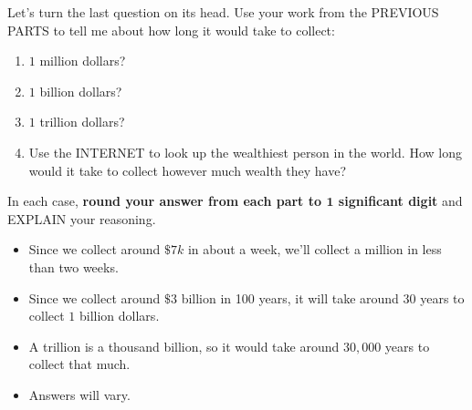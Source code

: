 \documentclass[nooutcomes,noauthor,hints,handout]{ximera}
\begin{document}
\begin{question}
  Let's turn the last question on its head. Use your work from the
  PREVIOUS PARTS to tell me about how long it would take to collect:
  \begin{enumerate}
  \item $1$ million dollars?
  \item $1$ billion dollars?
  \item $1$ trillion dollars?
  \item Use the INTERNET to look up the wealthiest person in the
    world. How long would it take to collect however much wealth they have?
  \end{enumerate}
  In each case, \textbf{round your answer from each part to $\boldsymbol{1}$
    significant digit} and EXPLAIN your reasoning.
  \begin{freeResponse}
    \begin{itemize}
      \item Since we collect around $\$7k$ in about a week, we'll
        collect a million in less than two weeks.
      \item Since we collect around $\$3$ billion in 100 years, it
        will take around $30$ years to collect $1$ billion dollars.
      \item A trillion is a thousand billion, so it would take around
        $30,000$ years to collect that much.
      \item Answers will vary.
    \end{itemize}
  \end{freeResponse}
\end{question}
\end{document}
